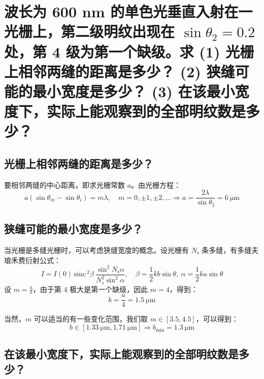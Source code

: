 \documentclass[UTF8]{report}
\def\sinc{\mathrm{\,sinc}\,}
\theoremstyle{MyLineTheoremStyle} %
\theoremstyle{MyBlockTheoremStyle} %
\theoremstyle{MySubsubsectionStyle} %
\begin{document}
\vspace*{-5mm}
\section{波长为 600 nm 的单色光垂直入射在一光栅上，第二级明纹出现在 $\sin \theta_2 = 0.2$ 处，第 4 级为第一个缺级。求 (1) 光栅上相邻两缝的距离是多少？ (2) 狭缝可能的最小宽度是多少？ (3) 在该最小宽度下，实际上能观察到的全部明纹数是多少？}

\vspace*{-3.5mm}
\subsection{光栅上相邻两缝的距离是多少？}
要相邻两缝的中心距离，即求光栅常数 $a$。由光栅方程：
\begin{equation}
a(\sin \theta_m - \sin \theta_i) = m\lambda,\quad m = 0, \pm1, \pm2, ... \Longrightarrow a = \frac{2 \lambda}{\sin \theta_2} = 6 \ \mathrm{\mu m}
\end{equation}

\vspace*{-8mm}
\subsection{狭缝可能的最小宽度是多少？}
当光栅是多缝光栅时，可以考虑狭缝宽度的概念。设光栅有 $N_\text{s}$ 条多缝，有多缝夫琅禾费衍射公式：
\begin{equation}
I = I(0) \sinc^2 \beta\  \frac{\sin^2 N_\text{s} \alpha}{N_s^2 \sin^2 \alpha} ,\quad \beta = \frac{1}{2}kb \sin \theta,\ \alpha = \frac{1}{2}ka \sin \theta
\end{equation}
设 $m = \frac{a}{b}$，由于第 4 极大是第一个缺级，因此 $m = 4$，得到：
\begin{equation}
b = \frac{a}{4} = 1.5 \ \mathrm{\mu m}
\end{equation}

当然，$m$ 可以适当的有一些变化范围，我们取 $m \in [3.5, 4.5]$，可以得到：
\begin{equation}
b \in [1.33 \ \mathrm{\mu m}, 1.71 \ \mathrm{\mu m}] \Longrightarrow b_{\min} = 1.3  \ \mathrm{\mu m}
\end{equation}

\vspace*{-6.5mm}
\subsection{在该最小宽度下，实际上能观察到的全部明纹数是多少？}
\end{document}
